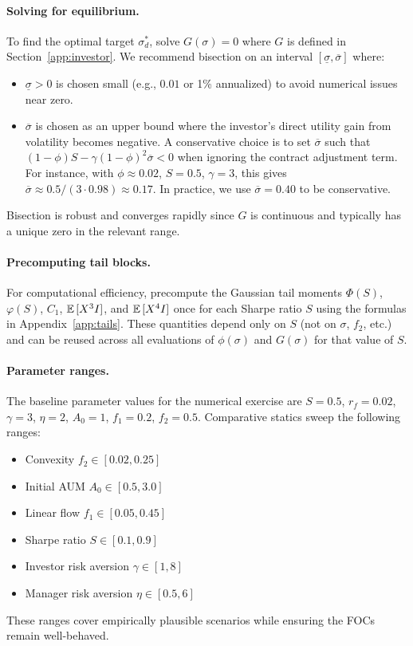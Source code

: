 \paragraph{Solving for equilibrium.}
To find the optimal target $\sigma_d^*$, solve $G(\sigma)=0$ where $G$ is defined in Section~\ref{app:investor}. We recommend bisection on an interval $[\underline\sigma,\overline\sigma]$ where:
\begin{itemize}
\item $\underline\sigma > 0$ is chosen small (e.g., $0.01$ or 1\% annualized) to avoid numerical issues near zero.
\item $\overline\sigma$ is chosen as an upper bound where the investor's direct utility gain from volatility becomes negative. A conservative choice is to set $\overline\sigma$ such that $(1-\phi)S - \gamma(1-\phi)^2\overline\sigma < 0$ when ignoring the contract adjustment term. For instance, with $\phi\approx 0.02$, $S=0.5$, $\gamma=3$, this gives $\overline\sigma \approx 0.5/(3\cdot 0.98) \approx 0.17$. In practice, we use $\overline\sigma = 0.40$ to be conservative.
\end{itemize}
Bisection is robust and converges rapidly since $G$ is continuous and typically has a unique zero in the relevant range.

\paragraph{Precomputing tail blocks.}
For computational efficiency, precompute the Gaussian tail moments $\Phi(S)$, $\varphi(S)$, $C_1$, ${\mathbb{E}}\,[X^3 I]$, and ${\mathbb{E}}\,[X^4 I]$ once for each Sharpe ratio $S$ using the formulas in Appendix~\ref{app:tails}. These quantities depend only on $S$ (not on $\sigma$, $f_2$, etc.) and can be reused across all evaluations of $\phi(\sigma)$ and $G(\sigma)$ for that value of $S$.

\paragraph{Parameter ranges.}
The baseline parameter values for the numerical exercise are $S=0.5$, $r_f=0.02$, $\gamma=3$, $\eta=2$, $A_0=1$, $f_1=0.2$, $f_2=0.5$. Comparative statics sweep the following ranges:
\begin{itemize}
\item Convexity $f_2 \in [0.02, 0.25]$ 
\item Initial AUM $A_0 \in [0.5, 3.0]$
\item Linear flow $f_1 \in [0.05, 0.45]$
\item Sharpe ratio $S \in [0.1, 0.9]$
\item Investor risk aversion $\gamma \in [1, 8]$
\item Manager risk aversion $\eta \in [0.5, 6]$
\end{itemize}
These ranges cover empirically plausible scenarios while ensuring the FOCs remain well-behaved.

